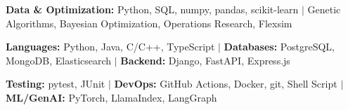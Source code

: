 %
%
\item\small{\textbf{Data \& Optimization:} Python, SQL, numpy, pandas, scikit-learn $|$ Genetic Algorithms, Bayesian Optimization, Operations Research, Flexsim}
\item\small{\textbf{Languages:} Python, Java, C/C++, TypeScript $|$ \textbf{Databases:} PostgreSQL, MongoDB, Elasticsearch $|$ \textbf{Backend:} Django, FastAPI, Express.js}
\item\small{\textbf{Testing:} pytest, JUnit $|$ \textbf{DevOps:} GitHub Actions, Docker, git, Shell Script $|$ \textbf{ML/GenAI:} PyTorch, LlamaIndex, LangGraph}%
